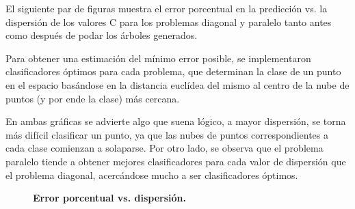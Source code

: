 \documentclass[a4paper, 11pt]{article} %
\begin{document}
El siguiente par de figuras muestra el error porcentual en la predicción vs. la
dispersión de los valores C para los problemas diagonal y paralelo tanto antes
como después de podar los árboles generados.

Para obtener una estimación del mínimo error posible, se implementaron
clasificadores óptimos para cada problema, que determinan la clase de un punto
en el espacio basándose en la distancia euclídea del mismo al centro de la nube
de puntos (y por ende la clase) más cercana.

En ambas gráficas se advierte algo que suena lógico, a mayor dispersión, se
torna más difícil clasificar un punto, ya que las nubes de puntos
correspondientes a cada clase comienzan a solaparse. Por otro lado, se observa
que el problema paralelo tiende a obtener mejores clasificadores para cada
valor de dispersión que el problema diagonal, acercándose mucho a ser
clasificadores óptimos. 

\begin{figure}[H]
\captionsetup[subfigure]{labelformat=empty}
  \centering
  \caption*{\textbf{Error porcentual vs. dispersión.}}
\end{figure}
\end{document}
